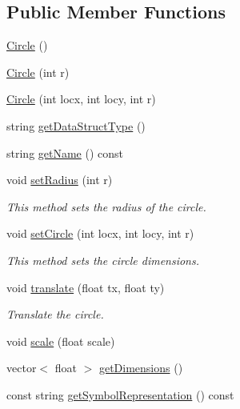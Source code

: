 \subsection*{Public Member Functions}
\begin{DoxyCompactItemize}
\item 
\hyperlink{classbridges_1_1datastructure_1_1_circle_a2106fef85f001fbd2de2d9870a432ef8}{Circle} ()
\item 
\hyperlink{classbridges_1_1datastructure_1_1_circle_aafbf518a6d7defa3d69d46d4bdda41da}{Circle} (int r)
\item 
\hyperlink{classbridges_1_1datastructure_1_1_circle_acde4da631bd56847058a29f03417ea4e}{Circle} (int locx, int locy, int r)
\item 
string \hyperlink{classbridges_1_1datastructure_1_1_circle_a366d6a7488f926c1d63d6480fc52e791}{get\+Data\+Struct\+Type} ()
\item 
string \hyperlink{classbridges_1_1datastructure_1_1_circle_a3c7808f7918cb01ceaa3f6bf46e6bee5}{get\+Name} () const
\item 
void \hyperlink{classbridges_1_1datastructure_1_1_circle_a5b93bf688d56c7781390e6f207501313}{set\+Radius} (int r)
\begin{DoxyCompactList}\small\item\em This method sets the radius of the circle. \end{DoxyCompactList}\item 
void \hyperlink{classbridges_1_1datastructure_1_1_circle_ab9a1f6a9b76bb4e19b7f5c3e19a0f37f}{set\+Circle} (int locx, int locy, int r)
\begin{DoxyCompactList}\small\item\em This method sets the circle dimensions. \end{DoxyCompactList}\item 
void \hyperlink{classbridges_1_1datastructure_1_1_circle_ac21454141030b7c5af288ddbe2028111}{translate} (float tx, float ty)
\begin{DoxyCompactList}\small\item\em Translate the circle. \end{DoxyCompactList}\item 
void \hyperlink{classbridges_1_1datastructure_1_1_circle_a77c35a4e0a69f8ba1b71c0c40c727eab}{scale} (float scale)
\item 
vector$<$ float $>$ \hyperlink{classbridges_1_1datastructure_1_1_circle_a4e08c866e2f10945c16921454d49a030}{get\+Dimensions} ()
\item 
const string \hyperlink{classbridges_1_1datastructure_1_1_circle_a796c88ccb8c5529d45aa7271a34fa3fe}{get\+Symbol\+Representation} () const
\end{DoxyCompactItemize}

